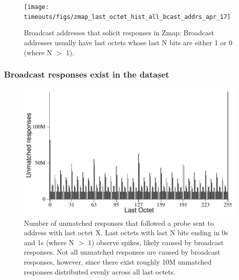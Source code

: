 \begin{figure}[t]
\begin{center}
\texttt{[image: timeouts/figs/zmap\_last\_octet\_hist\_all\_bcast\_addrs\_apr\_17]}
\end{center}
\caption{\label{fig:zmap_last_octet_hist}%
Broadcast addresses that solicit responses in Zmap: Broadcast addresses usually
have last octets whose last N bits are either 1 or 0
(where N $>$ 1).
}
\end{figure}


\subsubsection*{Broadcast responses exist in the dataset}

%
\begin{figure}[t]
\begin{center}
\includegraphics[width=.99\linewidth]{timeouts/figs/last_octet_hist}
\end{center}
\caption{\label{fig:bcast_hist}%
Number of unmatched responses that followed a probe sent to address
with last octet X. Last octets with last N bits ending in
0s and 1s (where N $>$ 1) observe spikes, likely caused by broadcast
responses. Not all unmatched responses are caused by broadcast
responses, however, since there exist roughly 10M unmatched
responses distributed evenly across all last octets.}
\end{figure}



